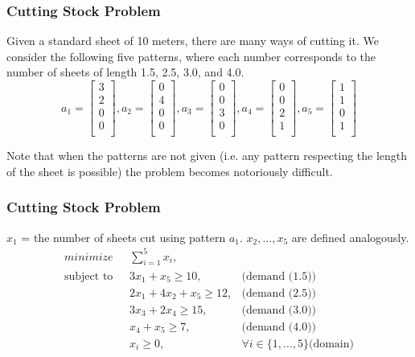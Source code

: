 \documentclass[11pt]{beamer}
\begin{document}
\begin{frame}
\frametitle{Cutting Stock Problem}
Given a standard sheet of 10 meters, there are many ways of cutting it. We consider the following five patterns, where each number corresponds to the number of sheets of length 1.5, 2.5, 3.0, and 4.0.
\[
a_{1} = 
\left[
\begin{array}{c}
3 \\
2 \\
0\\
0\\
\end{array}\right] ,
a_{2} = 
\left[
\begin{array}{c}
0 \\
4 \\
0\\
0\\
\end{array}\right] ,
a_{3} = 
\left[
\begin{array}{c}
0 \\
0 \\
3\\
0\\
\end{array}\right] ,
a_{4} = 
\left[
\begin{array}{c}
0 \\
0 \\
2 \\
1 \\
\end{array}\right] ,
a_{5} = 
\left[
\begin{array}{c}
1 \\
1 \\
0\\
1\\
\end{array}\right]\]

Note that when the patterns are not given (i.e. any pattern respecting the length of the sheet is possible) the problem becomes notoriously difficult.
\end{frame}


\begin{frame}
\frametitle{Cutting Stock Problem}
$x_{1}$ = the number of sheets cut using pattern $a_{1}$. $x_{2},\ldots,x_{5}$ are defined analogously.
\pause
\begin{align}
\displaystyle minimize \mbox{ } & \sum_{i=1}^{5}  x_{i}, \label{stock:objective} \\
% 
\mbox{subject to }&3x_{1} + x_{5} \geq 10, & \mbox{(demand (1.5))}  \label{stock:demand1}\\
&2x_{1} + 4x_{2} + x_{5} \geq 12, &  \mbox{(demand (2.5))}  \label{stock:demand2}\\
&3x_{3} + 2x_{4} \geq 15, & \mbox{(demand (3.0))}  \label{stock:demand3}\\
&x_{4} + x_{5} \geq 7, &  \mbox{(demand (4.0))}  \label{stock:demand4}\\
& x_{i} \geq 0, &\forall i \in\{1,\ldots,5\}  \mbox{(domain)} \label{stock:domain}
\end{align}
\end{frame}
\end{document}
